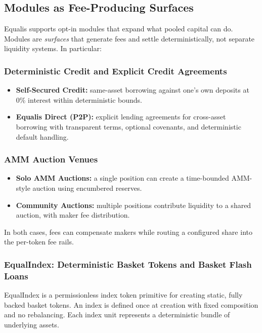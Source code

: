 \documentclass[version=preprint]{iacrcc}
\begin{document}
\subsection{Modules as Fee-Producing Surfaces}

Equalis supports opt-in modules that expand what pooled capital can do. Modules are \textit{surfaces} that generate fees and settle deterministically, not separate liquidity systems. In particular:

\subsubsection{Deterministic Credit and Explicit Credit Agreements}

\begin{itemize}
  \item \textbf{Self-Secured Credit:} same-asset borrowing against one’s own deposits at 0\% interest within deterministic bounds.
  \item \textbf{Equalis Direct (P2P):} explicit lending agreements for cross-asset borrowing with transparent terms, optional covenants, and deterministic default handling.
\end{itemize}

\subsubsection{AMM Auction Venues}

\begin{itemize}
  \item \textbf{Solo AMM Auctions:} a single position can create a time-bounded AMM-style auction using encumbered reserves.
  \item \textbf{Community Auctions:} multiple positions contribute liquidity to a shared auction, with maker fee distribution.
\end{itemize}
In both cases, fees can compensate makers while routing a configured share into the per-token fee rails.

\subsubsection{EqualIndex: Deterministic Basket Tokens and Basket Flash Loans}

EqualIndex is a permissionless index token primitive for creating static, fully backed basket tokens. An index is defined once at creation with fixed composition and no rebalancing. Each index unit represents a deterministic bundle of underlying assets.
\end{document}
